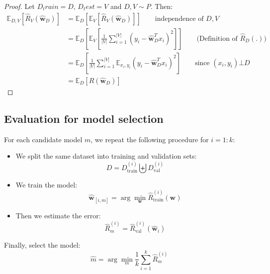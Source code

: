\documentclass[a4paper,10pt,twoside]{article}
\begin{document}
\begin{proof}[Proof]
    Let $D_train=D$, $D_test=V$ and $D,V\sim P$. Then:
    \begin{align*}
        \mathbb{E}_{D,V}[\hat{R}_V(\hat{\mathbf{w}}_D)] &= \mathbb{E}_D[\mathbb{E}_V[\hat{R}_V(\hat{\mathbf{w}}_D)]]\qquad\text{independence of $D,V$}\\
        &=\mathbb{E}_D[\mathbb{E}_V[\frac{1}{|V|}\sum_{i=1}^{|V|}(y_i-\hat{\mathbf{w}}_D^Tx_i)^2]]\qquad\text{(Definition of $\hat{R}_D(.)$)}\\
        &=\mathbb{E}_D[\frac{1}{|V|}\sum_{i=1}^{|V|}\mathbb{E}_{x_i, y_i}(y_i-\hat{\mathbf{w}}_D^Tx_i)^2]\qquad\text{since $(x_i,y_i)\bot D$}\\
        &=\mathbb{E}_D[R(\mathbf{\hat{w}}_D)]
    \end{align*}
\end{proof}
\subsection{Evaluation for model selection}
For each candidate model $m$, we repeat the following procedure for $i=1:k$:
\begin{itemize}
    \item We split the same dataset into training and validation sets:
    \begin{equation*}
        D=D_{\text{train}}^{(i)}\biguplus D_{\text{val}}^{(i)}
    \end{equation*}
    \item We train the model:
    \begin{equation*}
        \hat{\mathbf{w}}_[i,m]=\arg\min_{\mathbf{w}}\hat{R}_{\text{train}}^{(i)}(\mathbf{w})
    \end{equation*}
    \item Then we estimate the error:
    \begin{equation*}
        \hat{R}_{m}^{(i)}=\hat{R}_{\text{val}}^{(i)}(\hat{\mathbf{w}}_i)
    \end{equation*}
\end{itemize}
Finally, select the model:
\begin{equation*}
    \hat{m}=\arg\min_{m}\frac{1}{k}\sum_{i=1}^{k}\hat{R}_{m}^{(i)}
\end{equation*}
\end{document}
